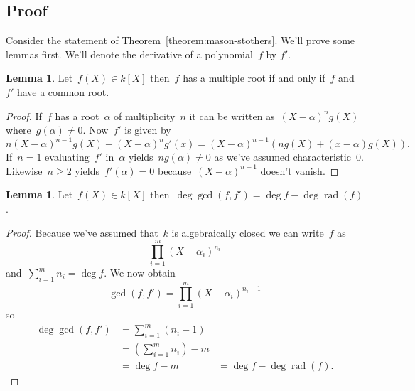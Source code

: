 \documentclass[11pt, a4paper, openany, oneside, article]{memoir}
\theoremstyle{definition}
\newtheorem{lemma}[theorem]{Lemma}
\DeclareMathOperator\rad{rad}
\begin{document}
\subsection{Proof}

Consider the statement of Theorem~\ref{theorem:mason-stothers}. We'll prove some lemmas first. We'll denote the derivative of a polynomial~$f$ by $f'$.

\begin{lemma}
  Let~$f(X)\in k[X]$ then~$f$ has a multiple root if and only if~$f$ and~$f'$ have a common root.

  \begin{proof}
    If~$f$ has a root~$\alpha$ of multiplicity~$n$ it can be written as~$(X-\alpha)^ng(X)$ where~$g(\alpha)\neq 0$. Now~$f'$ is given by
    \begin{equation}
      n(X-\alpha)^{n-1}g(X)+(X-\alpha)^ng'(x)=(X-\alpha)^{n-1}\left( ng(X)+(x-\alpha)g(X) \right).
    \end{equation}
    If~$n=1$ evaluating~$f'$ in~$\alpha$ yields~$ng(\alpha)\neq 0$ as we've assumed characteristic~$0$. Likewise~$n\geq 2$ yields~$f'(\alpha)=0$ because~$(X-\alpha)^{n-1}$ doesn't vanish.
  \end{proof}
\end{lemma}

\begin{lemma}
  Let~$f(X)\in k[X]$ then~$\deg\gcd(f,f')=\deg f-\deg\rad(f)$.

  \begin{proof}
    Because we've assumed that~$k$ is algebraically closed we can write~$f$ as
    \begin{equation}
      \prod_{i=1}^m(X-\alpha_i)^{n_i}
    \end{equation}
    and~$\sum_{i=1}^mn_i=\deg f$. We now obtain
    \begin{equation}
      \gcd(f,f')=\prod_{i=1}^m(X-\alpha_i)^{n_i-1}
    \end{equation}
    so
    \begin{equation}
      \begin{aligned}
        \deg\gcd(f,f')&=\sum_{i=1}^m(n_i-1) \\
        &=\left( \sum_{i=1}^mn_i \right)-m \\
        &=\deg f-m
        &=\deg f-\deg\rad(f).
      \end{aligned}
    \end{equation}
  \end{proof}
\end{lemma}
\end{document}

